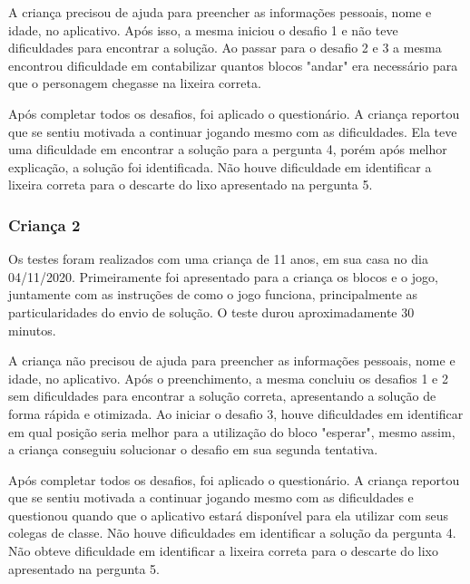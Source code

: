A criança precisou de ajuda para preencher as informações pessoais, nome e idade, no aplicativo. Após isso, a mesma iniciou o desafio 1 e não teve dificuldades para encontrar a solução. Ao passar para o desafio 2 e 3 a mesma encontrou dificuldade em contabilizar quantos blocos "andar" era necessário para que o personagem chegasse na lixeira correta.

Após completar todos os desafios, foi aplicado o questionário. A criança reportou que se sentiu motivada a continuar jogando mesmo com as dificuldades. Ela teve uma dificuldade em encontrar a solução para a pergunta 4, porém após melhor explicação, a solução foi identificada. Não houve dificuldade em identificar a lixeira correta para o descarte do lixo apresentado na pergunta 5. 

\subsubsection{Criança 2}

Os testes foram realizados com uma criança de 11 anos, em sua casa no dia 04/11/2020. Primeiramente foi apresentado para a criança os blocos e o jogo, juntamente com as instruções de como o jogo funciona, principalmente as particularidades do envio de solução. O teste durou aproximadamente 30 minutos.

A criança não precisou de ajuda para preencher as informações pessoais, nome e idade, no aplicativo. Após o preenchimento, a mesma concluiu os desafios 1 e 2 sem dificuldades para encontrar a solução correta, apresentando a solução de forma rápida e otimizada. Ao iniciar o desafio 3, houve dificuldades em identificar em qual posição seria melhor para a utilização do bloco "esperar", mesmo assim, a criança conseguiu solucionar o desafio em sua segunda tentativa.

Após completar todos os desafios, foi aplicado o questionário. A criança reportou que se sentiu motivada a continuar jogando mesmo com as dificuldades e questionou quando que o aplicativo estará disponível para ela utilizar com seus colegas de classe.  Não houve dificuldades em identificar a solução da pergunta 4. Não obteve dificuldade em identificar a lixeira correta para o descarte do lixo apresentado na pergunta 5. 